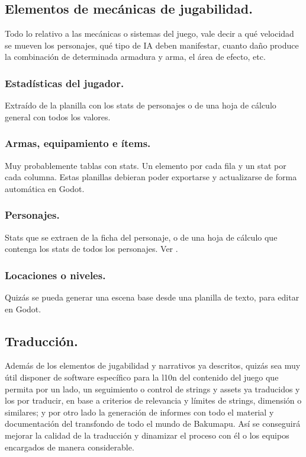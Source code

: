 \subsection{Elementos de mecánicas de jugabilidad.}\label{kit:elementos-de-mecanicas}
Todo lo relativo a las mecánicas o sistemas del juego, vale decir a qué velocidad se mueven los personajes, qué tipo de IA deben manifestar, cuanto daño produce la combinación de determinada armadura y arma, el área de efecto, etc.

\subsubsection{Estadísticas del jugador.}\label{kit:estadisticas-del-jugador}
Extraído de la planilla con los stats de personajes o de una hoja de cálculo general con todos los valores.

\subsubsection{Armas, equipamiento e ítems.}\label{kit:armas-equipamiento-items}
Muy probablemente tablas con stats. Un elemento por cada fila y un stat por cada columna. Estas planillas debieran poder exportarse y actualizarse de forma automática en Godot.

\subsubsection{Personajes.}\label{kit:personajes}
Stats que se extraen de la ficha del personaje, o de una hoja de cálculo que contenga los stats de todos los personajes. Ver .

\subsubsection{Locaciones o niveles.}\label{kit:locaciones-o-niveles}
Quizás se pueda generar una escena base desde una planilla de texto, para editar en Godot.

\subsection{Traducción.}
Además de los elementos de jugabilidad y narrativos ya descritos, quizás sea muy útil disponer de software específico para la l10n del contenido del juego que permita por un lado, un seguimiento o control de strings y assets ya traducidos y los por traducir, en base a criterios de relevancia y límites de strings, dimensión o similares; y por otro lado la generación de informes con todo el material y documentación del transfondo de todo el mundo de Bakumapu. Así se conseguirá mejorar la calidad de la traducción y dinamizar el proceso con él o los equipos encargados de manera considerable.

